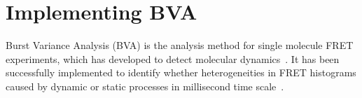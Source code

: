 \section{Implementing BVA}


Burst Variance Analysis (BVA) is the analysis method for single molecule FRET experiments, which has developed to detect molecular dynamics~\cite{Torella_2011}. It has been successfully implemented to identify whether heterogeneities in FRET histograms caused by dynamic or static processes in millisecond time scale~\cite{Torella_2011}\cite{Robb_2013}.